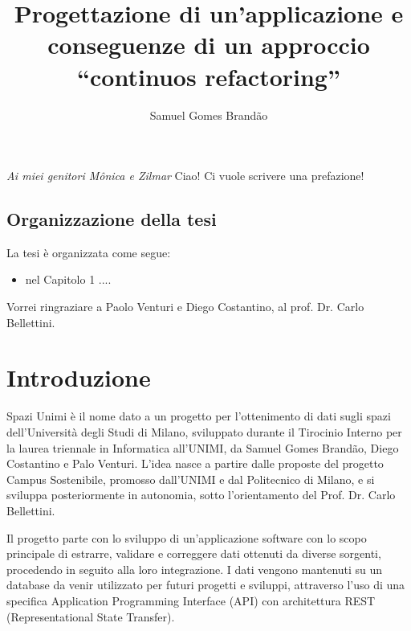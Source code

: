 \documentclass[12pt]{report}
\begin{document}
\title{Progettazione di un'applicazione e conseguenze di un approccio ``continuos refactoring''}
\author{Samuel Gomes Brandão}
%
% 
%
\beforepreface
\prefacesection{}
        {\hfill \Large {\sl Ai miei genitori Mônica e Zilmar}}
% 
%
Ciao! Ci vuole scrivere una prefazione!
%
%
\section*{Organizzazione della tesi}
\label{organizzazione}
La tesi \`e organizzata come segue:
\begin{itemize}
\item nel Capitolo 1 ....
\end{itemize}
%
%
Vorrei ringraziare a Paolo Venturi e Diego Costantino, 
al prof. Dr. Carlo Bellettini. 
\afterpreface


% 
% 
\chapter{Introduzione}
\label{cap1}
Spazi Unimi è il nome dato a un progetto per l’ottenimento di dati sugli spazi dell’Università degli Studi di Milano, sviluppato durante il Tirocinio Interno per la laurea triennale in Informatica all’UNIMI, da Samuel Gomes Brandão, Diego Costantino e Palo Venturi. L’idea nasce a partire dalle proposte del progetto Campus Sostenibile, promosso dall’UNIMI e dal Politecnico di Milano, e si sviluppa posteriormente in autonomia, sotto l’orientamento del Prof. Dr. Carlo Bellettini.

Il progetto parte con lo sviluppo di un'applicazione software con lo scopo principale di estrarre, validare e correggere dati ottenuti da diverse sorgenti, procedendo in seguito alla loro integrazione. I dati vengono mantenuti su un database da venir utilizzato per futuri progetti e sviluppi, attraverso l’uso di una specifica Application Programming Interface (API) con architettura REST (Representational State Transfer). 
\end{document}
